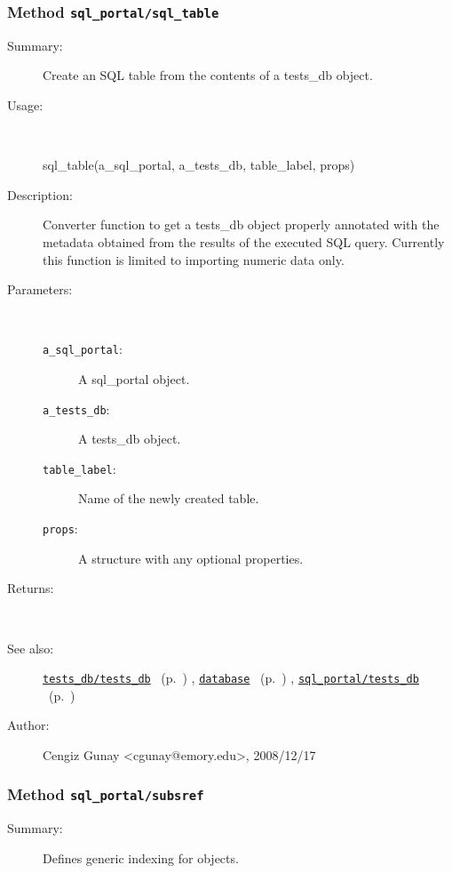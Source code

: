 \subsubsection[Method \texttt{sql\_table}]{Method \texttt{sql\_portal/sql\_table}}%
%
\label{ref_sql_portal__sql_table}%
\hypertarget{ref_sql_portal__sql_table}{}%
\begin{description}
\item[Summary:]Create an SQL table from the contents of a tests\_db object.
%
\item[Usage:]~%
\begin{lyxcode}%
sql\_table(a\_sql\_portal, a\_tests\_db, table\_label, props)
%
\end{lyxcode}%
%
\item[Description:]%
Converter function to get a tests\_db object properly annotated with
 the metadata obtained from the results of the executed SQL
 query. Currently this function is limited to importing numeric data only.
\item[Parameters:]~
\begin{description}%
\item[\texttt{a\_sql\_portal}:]
 A sql\_portal object.
\item[\texttt{a\_tests\_db}:]
 A tests\_db object.
\item[\texttt{table\_label}:]
 Name of the newly created table.
\item[\texttt{props}:]
 A structure with any optional properties.
\end{description}%
%
\item[Returns:
]~

%
%
\item[See also:]%
\hyperlink{ref_tests_db__tests_db}{\texttt{tests\_db/tests\_db}}%
\ (p.~\pageref{ref_tests_db__tests_db})%
%
, \hyperlink{ref_database}{\texttt{database}}%
\ (p.~\pageref{ref_database})%
%
, \hyperlink{ref_sql_portal__tests_db}{\texttt{sql\_portal/tests\_db}}%
\ (p.~\pageref{ref_sql_portal__tests_db})%
%
%
\item[Author:]%
Cengiz Gunay <cgunay@emory.edu>, 2008/12/17
%
\end{description}
\methodline%
\subsubsection[Method \texttt{subsref}]{Method \texttt{sql\_portal/subsref}}%
%
\label{ref_sql_portal__subsref}%
\hypertarget{ref_sql_portal__subsref}{}%
\begin{description}
\item[Summary:]Defines generic indexing for objects.
%
%
%
%
%
%
%
%
\end{description}
\methodline%
